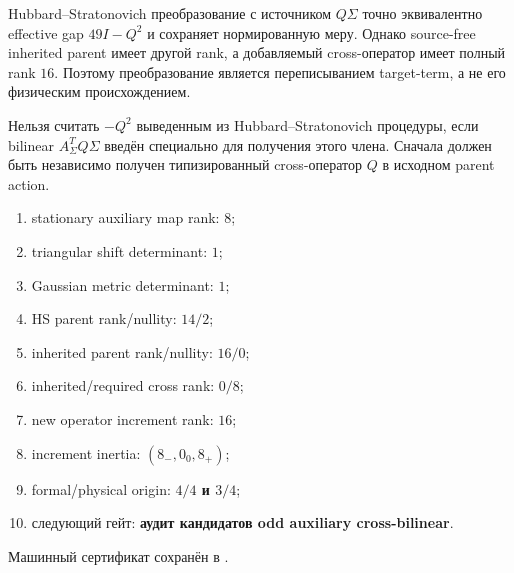 \begin{theorem}
Hubbard--Stratonovich преобразование с источником $Q\Sigma$ точно
эквивалентно effective gap $49I-Q^2$ и сохраняет нормированную меру.
Однако source-free inherited parent имеет другой rank, а добавляемый
cross-оператор имеет полный rank $16$. Поэтому преобразование является
переписыванием target-term, а не его физическим происхождением.
\end{theorem}

\begin{nogocriterion}
Нельзя считать $-Q^2$ выведенным из Hubbard--Stratonovich процедуры, если
bilinear $A_\Sigma^TQ\Sigma$ введён специально для получения этого члена.
Сначала должен быть независимо получен типизированный cross-оператор $Q$ в
исходном parent action.
\end{nogocriterion}

\begin{protocol}\begin{enumerate}
\item stationary auxiliary map rank: \textbf{$8$};
\item triangular shift determinant: \textbf{$1$};
\item Gaussian metric determinant: \textbf{$1$};
\item HS parent rank/nullity: \textbf{$14/2$};
\item inherited parent rank/nullity: \textbf{$16/0$};
\item inherited/required cross rank: \textbf{$0/8$};
\item new operator increment rank: \textbf{$16$};
\item increment inertia: \textbf{$(8_-,0_0,8_+)$};
\item formal/physical origin: \textbf{$4/4$ и $3/4$};
\item следующий гейт: \textbf{аудит кандидатов odd auxiliary cross-bilinear}.
\end{enumerate}\end{protocol}

Машинный сертификат сохранён в
.